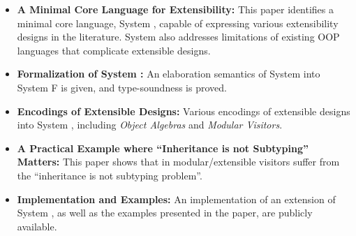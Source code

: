 
\begin{itemize}

\item {\bf A Minimal Core Language for Extensibility:} This paper
  identifies a minimal core language, System \name, capable of
  expressing various extensibility designs in the literature.
  System \name also addresses limitations of existing OOP
  languages that complicate extensible designs. 
  
\item {\bf Formalization of System \name:} An elaboration semantics of
  System \name into System F is given, and type-soundness is proved.

\item {\bf Encodings of Extensible Designs:} Various encodings of
  extensible designs into System \name, including \emph{Object
    Algebras} and \emph{Modular Visitors}. 

\item {\bf A Practical Example where ``Inheritance is not Subtyping''
    Matters:} This paper shows that in modular/extensible visitors
  suffer from the ``inheritance is not subtyping problem''. 

\item {\bf Implementation and Examples:} An implementation of an
  extension of System \name, as well as the examples presented in the
  paper, are publicly available. 

\begin{comment}

\item{elaboration typing rules which given a source expression with intersection
    types, typecheck and translate it into an ordinary F term. Prove a type
    preservation result: if a term $ e $ has type $ \tau $ in the source language,
    then the translated term $ \im e $ is well-typed and has type $ \im \tau $ in the
    target language.}

\item{present an algorithm for detecting incoherence which can be very important
    in practice.}

\item{explores the connection between intersection types and object algebra by
    showing various examples of encoding object algebra with intersection
    types.}

\end{comment}

\end{itemize}

